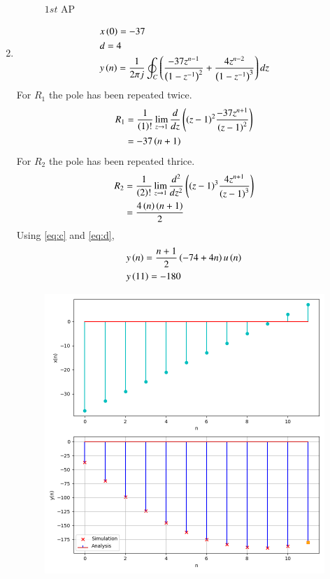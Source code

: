 \documentclass[journal,12pt,twocolumn]{IEEEtran}
\theoremstyle{remark}
\begin{document}
\begin{enumerate}[label=(\alph*)]
\begin{figure}[h!]
        \caption{$1st$ AP}
    \end{figure}
    \item \begin{align}
        &x\left(0\right)=-37 \\
        &d=4 \\
        &y\left(n\right)=\frac{1}{2\pi j}\oint_{C}\left(\dfrac{-37z^{n-1}}{\left(1-z^{-1}\right)^2} + \dfrac{4z^{n-2}}{\left(1-z^{-1}\right)^{3}}\right)dz
    \end{align}
    For $R_1$ the pole has been repeated twice.
\begin{align}
    R_1&=\frac{1}{\left(1\right)!}\lim\limits_{z\to 1}\frac{d}{dz}\left({\left(z-1\right)}^{2}\frac{-37z^{n+1}}{{\left(z-1\right)}^2}\right)\\
    &=-37\left(n+1\right)\label{eq:c}
\end{align}
    For $R_2$ the pole has been repeated thrice.
\begin{align}
    R_2&=\frac{1}{\left(2\right)!}\lim\limits_{z\to 1}\frac{d^{2}}{dz^{2}}\left({\left(z-1\right)}^{3}\frac{4z^{n+1}}{{\left(z-1\right)}^3}\right)\\
    &=\frac{4\left(n\right)\left(n+1\right)}{2}\label{eq:d}
\end{align}
Using \eqref{eq:c} and \eqref{eq:d},
\begin{align}
    &y\left(n\right)=\dfrac{n+1}{2}\left(-74+4n\right)u\left(n\right)\\
    &y\left(11\right)=-180
\end{align}
    \begin{figure}[h!]
        \centering
        \includegraphics[width=\columnwidth]{figs/plt2.png}

\end{figure}
\end{enumerate}
\end{document}
